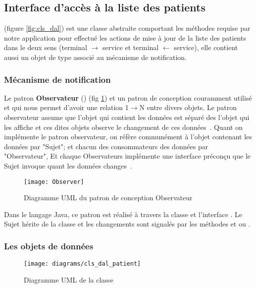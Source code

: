 \subsection{Interface d’accès à la liste des patients}

 (figure
\ref{fig:cls_dal}) est une classe abstraite comportant les méthodes
requise par notre application pour effectué les actions de mise à jour de la liste des patients dans le deux sens (terminal $\rightarrow$ service et terminal $\leftarrow$ service), elle contient aussi un objet de type  associé au mécanisme de notification.

\subsubsection{Mécanisme de notification}

Le patron \textbf{Observateur} () (fig
\ref{fig:observer}) et un patron de conception couramment utilisé et qui
nous permet d'avoir une relation 1$\rightarrow$N entre divers objets. Le
patron observateur assume que l'objet qui contient les données est
séparé des l’objet qui les affiche et ces dites objets observe le
changement de ces données~\cite{jdp_observer}. Quant on implémente le
patron observateur, on réfère communément à l'objet contenant les
données par "Sujet"; et chacun des consommateurs des données par
"Observateur", Et chaque Observateurs implémente une interface préconçu
que le Sujet invoque quant les données changes~\cite{jdp_observer}.

\begin{figure}[H]
\center
\texttt{[image: Observer]}
\caption{Diagramme UML du patron de conception Observateur~\cite{wikipedia:observer}}
\label{fig:observer}
\end{figure}

Dans le langage Java, ce patron est réalisé à travers la classe  et l'interface . Le Sujet hérite de la classe  et les changements sont signalés par les méthodes  et  ou .

\subsubsection {Les objets de données}

\begin{figure}
\center
\texttt{[image: diagrams/cls\_dal\_patient]}
\caption{Diagramme UML de la classe  }
\label{fig:cls_dal_patient}
\end{figure}


